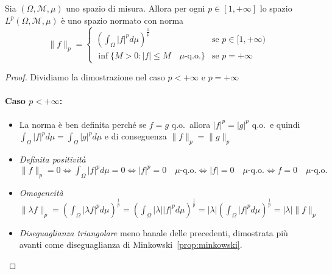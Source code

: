 \begin{proposition}\label{prp:spazio-Lp-normato}
    Sia \((\Omega, \mathcal{M}, \mu)\) uno spazio di misura. Allora per ogni
    \(p \in [1, +\infty]\) lo spazio \(L^{p}(\Omega, \mathcal{M}, \mu)\) è uno
    spazio normato con norma
    \[
        \|f\|_p = 
        \begin{cases}
            \displaystyle
            {\left( \int_{\Omega} |f|^{p} d\mu
            \right)}^{\frac{1}{p}} & \text{se } p \in [1, +\infty) \\
            \inf \{M > 0 : |f| \le M \quad \mu\text{-q.o.} \} & \text{se } p = +\infty
        \end{cases}
    \]
\end{proposition}
\begin{proof}
    Dividiamo la dimostrazione nel caso \(p < +\infty\) e \(p = +\infty\) 

    \paragraph{Caso \(p < +\infty\):}
\begin{itemize}[label = --]
    \item La norma è ben definita perché se \(f = g\) q.o.~allora \(|f|^{p} =
        |g|^{p}\) q.o.~e quindi \(\int_{\Omega} |f|^{p} d\mu = \int_{\Omega}
        |g|^{p} d\mu\) e di conseguenza \(\|f\|_p = \|g\|_p\) 
    \item \emph{Definita positività} \(\|f\|_p = 0 \iff \int_{\Omega} |f|^{p}
        d\mu = 0 \iff |f|^{p} = 0 \quad \mu\text{-q.o.} \iff |f| = 0 \quad
        \mu\text{-q.o.} \iff f = 0 \quad \mu\text{-q.o.}\)
    \item \emph{Omogeneità} \(\|\lambda f\|_p = {\left( \int_{\Omega} |\lambda
        f|^{p} d\mu \right)}^{\frac{1}{p}} = {\left( \int_{\Omega} |\lambda |
        |f|^{p} d\mu \right)}^{\frac{1}{p}} = |\lambda| {\left( \int_{\Omega}
        |f|^{p} d\mu \right)}^{\frac{1}{p}} = |\lambda| \|f\|_p\)
    \item \emph{Diseguaglianza triangolare} meno banale delle precedenti,
        dimostrata più avanti come diseguaglianza di
        Minkowski~\ref{prop:minkowski}.
\end{itemize}

\end{proof}
